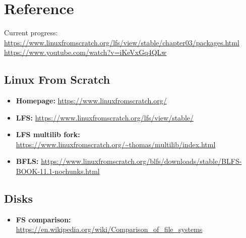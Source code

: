 \documentclass[10pt, a4paper, onecolumn, oneside, titlepage, openany]{book}
\begin{document}
\chapter{Reference}
Current progress:
\newline \url{https://www.linuxfromscratch.org/lfs/view/stable/chapter03/packages.html}
\newline \url{https://www.youtube.com/watch?v=iKeVxGq4QLw}
\section{Linux From Scratch}
\begin{itemize}
    \item \textbf{Homepage:} \url{https://www.linuxfromscratch.org/}
    \item \textbf{LFS:} \url{https://www.linuxfromscratch.org/lfs/view/stable/}
    \item \textbf{LFS multilib fork:} \url{https://www.linuxfromscratch.org/~thomas/multilib/index.html}
    \item \textbf{BFLS:} \url{https://www.linuxfromscratch.org/blfs/downloads/stable/BLFS-BOOK-11.1-nochunks.html}
\end{itemize}

\section{Disks}
\begin{itemize}
    \item \textbf{FS comparison:} \url{https://en.wikipedia.org/wiki/Comparison_of_file_systems}
\end{itemize}
\end{document}
